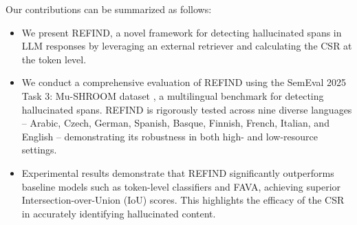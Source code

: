 Our contributions can be summarized as follows:

\vspace{-0.075in}

\begin{itemize}[itemsep=0.3mm, parsep=1pt, leftmargin=*]

    \item We present REFIND, a novel framework for detecting hallucinated spans in LLM responses by leveraging an external retriever and calculating the CSR at the token level.
    \item We conduct a comprehensive evaluation of REFIND using the SemEval 2025 Task 3: Mu-SHROOM dataset \cite{vazquez-etal-2025-mu-shroom}, a multilingual benchmark for detecting hallucinated spans.  REFIND is rigorously tested across nine diverse languages – Arabic, Czech, German, Spanish, Basque, Finnish, French, Italian, and English – demonstrating its robustness in both high- and low-resource settings.
    \item Experimental results demonstrate that REFIND significantly outperforms baseline models such as token-level classifiers and FAVA, achieving superior Intersection-over-Union (IoU) scores. This highlights the efficacy of the CSR in accurately identifying hallucinated content.
\end{itemize}